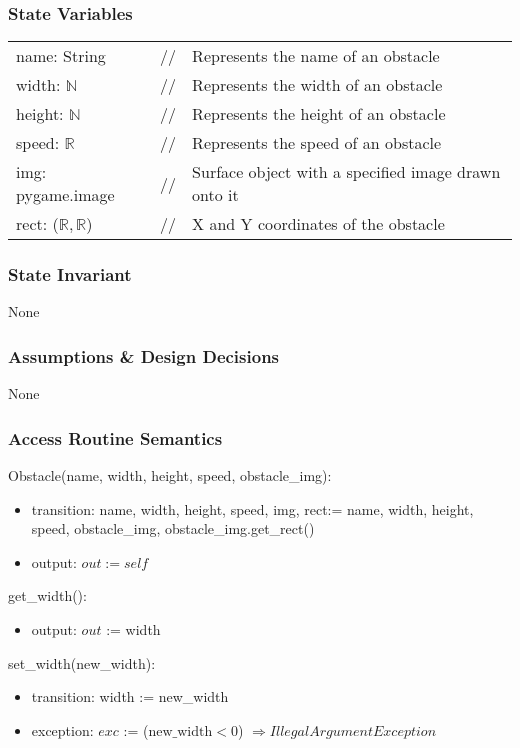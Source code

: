 \documentclass[12pt]{article}
\begin{document}
\subsubsection* {State Variables}
\begin{tabular}{lll}
name: String & // & Represents the name of an obstacle\\
    width: $\mathbb{N}$ & // & Represents the width of an obstacle\\
    height: $\mathbb{N}$ & // & Represents the height of an obstacle\\
    speed: $\mathbb{R}$ & // & Represents the speed of an obstacle\\
    img: pygame.image & // & Surface object with a specified image drawn onto it\\
    rect: ($\mathbb{R,R}$) & // & X and Y coordinates of the obstacle\\
\end{tabular}

\subsubsection* {State Invariant}

None

\subsubsection* {Assumptions \& Design Decisions}

None

\subsubsection* {Access Routine Semantics}

\noindent Obstacle(name, width, height, speed, obstacle\_img):
\begin{itemize}
    \item transition:  name, width, height, speed, img, rect:= name, width, height, speed, obstacle\_img, obstacle\_img.get\_rect()
    \item output: $out := self$
\end{itemize}

\noindent get\_width():
\begin{itemize}
    \item output: $out$ := width 
\end{itemize}


\noindent set\_width(new\_width):
\begin{itemize}
    \item transition: width := new\_width 
    \item exception: $exc$ := ($\text{new\_width} < 0$) $\Rightarrow  IllegalArgumentException$
\end{itemize}
\end{document}
